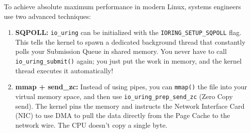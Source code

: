 \documentclass[11pt, a4paper]{article}
\begin{document}
To achieve absolute maximum performance in modern Linux, systems engineers use two advanced techniques:

\begin{enumerate}
    \item \textbf{SQPOLL:} \texttt{io\_uring} can be initialized with the \texttt{IORING\_SETUP\_SQPOLL} flag. This tells the kernel to spawn a dedicated background thread that constantly polls your Submission Queue in shared memory. You never have to call \texttt{io\_uring\_submit()} again; you just put the work in memory, and the kernel thread executes it automatically!
    \item \textbf{mmap + send\_zc:} Instead of using pipes, you can \texttt{mmap()} the file into your virtual memory space, and then use \texttt{io\_uring\_prep\_send\_zc} (Zero Copy send). The kernel pins the memory and instructs the Network Interface Card (NIC) to use DMA to pull the data directly from the Page Cache to the network wire. The CPU doesn't copy a single byte.
\end{enumerate}
\end{document}
